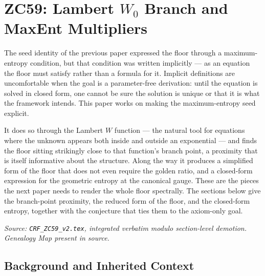 \documentclass[12pt, a4paper]{article}
\begin{document}
\section{ZC59: Lambert $W_{0}$ Branch and MaxEnt Multipliers}

The seed identity of the previous paper expressed the floor through a maximum-
entropy condition, but that condition was written implicitly --- as an equation
the floor must satisfy rather than a formula for it. Implicit definitions are
uncomfortable when the goal is a parameter-free derivation: until the equation
is solved in closed form, one cannot be sure the solution is unique or that it
is what the framework intends. This paper works on making the maximum-entropy
seed explicit.

It does so through the Lambert $W$ function --- the natural tool for equations
where the unknown appears both inside and outside an exponential --- and finds
the floor sitting strikingly close to that function's branch point, a proximity
that is itself informative about the structure. Along the way it produces a
simplified form of the floor that does not even require the golden ratio, and a
closed-form expression for the geometric entropy at the canonical gauge. These
are the pieces the next paper needs to render the whole floor spectrally. The
sections below give the branch-point proximity, the reduced form of the floor,
and the closed-form entropy, together with the conjecture that ties them to the
axiom-only goal.
\label{sec:zc59}

\noindent
\textit{Source: \texttt{CRF\_ZC59\_v2.tex}, integrated verbatim modulo
section-level demotion. Genealogy Map present in source.}

\medskip
\subsection{Background and Inherited Context}
\label{sec:background}
\end{document}
